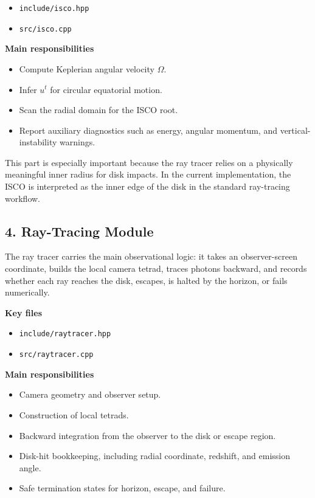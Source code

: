 \documentclass[11pt]{article}
\begin{document}
\begin{itemize}[leftmargin=1.5em]
    \item \texttt{include/isco.hpp}
    \item \texttt{src/isco.cpp}
\end{itemize}

\textbf{Main responsibilities}

\begin{itemize}[leftmargin=1.5em]
    \item Compute Keplerian angular velocity $\Omega$.
    \item Infer $u^t$ for circular equatorial motion.
    \item Scan the radial domain for the ISCO root.
    \item Report auxiliary diagnostics such as energy, angular momentum, and vertical-instability warnings.
\end{itemize}

This part is especially important because the ray tracer relies on a physically meaningful inner radius for disk impacts. In the current implementation, the ISCO is interpreted as the inner edge of the disk in the standard ray-tracing workflow.

\subsection{4. Ray-Tracing Module}

The ray tracer carries the main observational logic: it takes an observer-screen coordinate, builds the local camera tetrad, traces photons backward, and records whether each ray reaches the disk, escapes, is halted by the horizon, or fails numerically.

\textbf{Key files}

\begin{itemize}[leftmargin=1.5em]
    \item \texttt{include/raytracer.hpp}
    \item \texttt{src/raytracer.cpp}
\end{itemize}

\textbf{Main responsibilities}

\begin{itemize}[leftmargin=1.5em]
    \item Camera geometry and observer setup.
    \item Construction of local tetrads.
    \item Backward integration from the observer to the disk or escape region.
    \item Disk-hit bookkeeping, including radial coordinate, redshift, and emission angle.
    \item Safe termination states for horizon, escape, and failure.
\end{itemize}
\end{document}
